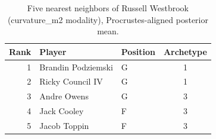 \begin{table}[htbp]
  \centering\small
  \begin{tabular}{rllc}
    \toprule
    Rank & Player & Position & Archetype \\
    \midrule
    1 & Brandin Podziemski & G & 1 \\
    2 & Ricky Council IV & G & 1 \\
    3 & Andre Owens & G & 3 \\
    4 & Jack Cooley & F & 3 \\
    5 & Jacob Toppin & F & 3 \\
    \bottomrule
  \end{tabular}
  \caption{Five nearest neighbors of Russell Westbrook (curvature_m2 modality), Procrustes-aligned posterior mean.}
  \label{tab:Russell_Westbrook_neighbors_curvature_m2}
\end{table}

